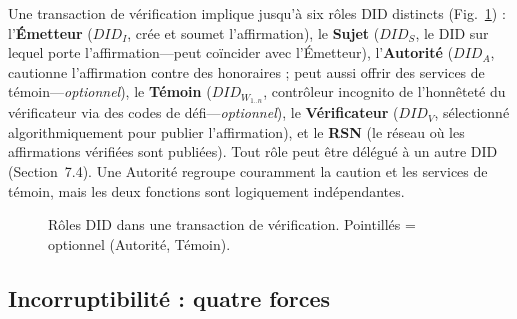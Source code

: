 \documentclass[11pt,a4paper,twocolumn]{article}
\begin{document}
Une transaction de vérification implique jusqu'à six rôles DID distincts (Fig.~\ref{fig:roles}) : l'\textbf{Émetteur} ($DID_I$, crée et soumet l'affirmation), le \textbf{Sujet} ($DID_S$, le DID sur lequel porte l'affirmation---peut coïncider avec l'Émetteur), l'\textbf{Autorité} ($DID_A$, cautionne l'affirmation contre des honoraires ; peut aussi offrir des services de témoin---\emph{optionnel}), le \textbf{Témoin} ($DID_{W_{1..n}}$, contrôleur incognito de l'honnêteté du vérificateur via des codes de défi---\emph{optionnel}), le \textbf{Vérificateur} ($DID_V$, sélectionné algorithmiquement pour publier l'affirmation), et le \textbf{RSN} (le réseau où les affirmations vérifiées sont publiées). Tout rôle peut être délégué à un autre DID (Section~7.4). Une Autorité regroupe couramment la caution et les services de témoin, mais les deux fonctions sont logiquement indépendantes.

\begin{figure}[ht]
\centering
{}
\caption{Rôles DID dans une transaction de vérification. Pointillés = optionnel (Autorité, Témoin).}
\label{fig:roles}
\end{figure}

\subsection{Incorruptibilité : quatre forces}
\end{document}

